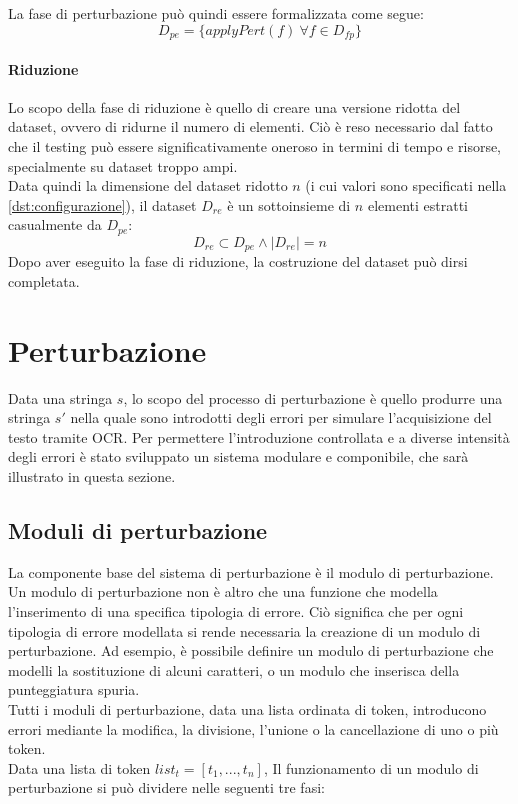 La fase di perturbazione può quindi essere formalizzata come segue:
\begin{equation}
D_{pe} = \{applyPert(f)\ \forall f \in D_{fp}\}
\end{equation}

\paragraph{Riduzione}
Lo scopo della fase di riduzione è quello di creare una versione ridotta del dataset, ovvero di ridurne il numero di elementi. Ciò è reso necessario dal fatto che il testing può essere significativamente oneroso in termini di tempo e risorse, specialmente su dataset troppo ampi.\\
Data quindi la dimensione del dataset ridotto $n$ (i cui valori sono specificati nella \autoref{dst:configurazione}), il dataset $D_{re}$ è un sottoinsieme di $n$ elementi estratti casualmente da $D_{pe}$:
\begin{equation}
D_{re} \subset D_{pe} \wedge |D_{re}| = n
\end{equation}
Dopo aver eseguito la fase di riduzione, la costruzione del dataset può dirsi completata.


\section{Perturbazione}
\label{dst:perturbazione}
Data una stringa $s$, lo scopo del processo di perturbazione è quello produrre una stringa $s\prime$ nella quale sono introdotti degli errori per simulare l'acquisizione del testo tramite OCR. Per permettere l'introduzione controllata e a diverse intensità degli errori è stato sviluppato un sistema modulare e componibile, che sarà illustrato in questa sezione.

\subsection{Moduli di perturbazione}
\label{dst:modpert}
La componente base del sistema di perturbazione è il modulo di perturbazione. Un modulo di perturbazione non è altro che una funzione che modella l'inserimento di una specifica tipologia di errore. Ciò significa che per ogni tipologia di errore modellata si rende necessaria la creazione di un modulo di perturbazione. Ad esempio, è possibile definire un modulo di perturbazione che modelli la sostituzione di alcuni caratteri, o un modulo che inserisca della punteggiatura spuria. \\
Tutti i moduli di perturbazione, data una lista ordinata di token, introducono errori mediante la modifica, la divisione, l'unione o la cancellazione di uno o più token. \\
Data una lista di token $list_t = [t_1,...,t_n]$,
Il funzionamento di un modulo di perturbazione si può dividere nelle seguenti tre fasi:

